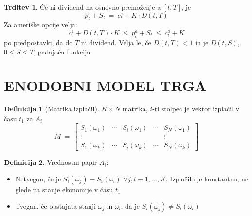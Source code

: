 \documentclass[11pt]{article}
\newcommand{\1}{\mathbbm{1}}
\theoremstyle{definition}
\newtheorem{definicija}{Definicija}[section]
\theoremstyle{definition}
\newtheorem{trditev}{Trditev}[section]
\begin{document}
\begin{trditev}

Če ni dividend na osnovno premoženje  a $[t, T]$, je
$$p_t^e + S_t ~=~ c_t^e + K \cdot D(t, T)$$
Za ameriške opcije velja:
$$c_t^a + D(t, T) \cdot K ~\leq~ p_t^a + S_t ~\leq~ c_t^a + K$$
po predpostavki, da do $T$ ni dividend. Velja le, če $D(t, T)<1$ in je $D(t, S)$, $0 \leq S \leq T$, padajoča funkcija. 

\end{trditev}
\vspace{0.5cm}

\pagebreak


\section{ENODOBNI MODEL TRGA}
\vspace{0.5cm}

\begin{definicija}[Matrika izplačil]

$K \times N$ matrika, $i$-ti stolpec je vektor izplačil v času $t_1$ za $A_i$
$$M ~=~ \begin{bmatrix}
S_1(\omega_1) & \cdots & S_i(\omega_1) & \cdots & S_N(\omega_1) \\
\vdots & ~ & ~ & ~ & \vdots \\
S_1(\omega_k) & \cdots & S_i(\omega_k) & \cdots & S_N(\omega_k)
\end{bmatrix}$$

\end{definicija}
\vspace{0.5cm}

\begin{definicija}

Vrednostni papir $A_i$:
\begin{itemize}

	\item Netvegan, če je $S_i(\omega_j) = S_i(\omega_l)$ $\forall j,l = 1, \ldots, K$. Izplačilo je konstantno, ne glede na stanje ekonomije v času $t_1$
	\item Tvegan, če obstajata stanji $\omega_j$ in $\omega_l$, da je $S_i(\omega_j) \neq S_i(\omega_l)$

\end{itemize}

\end{definicija}
\vspace{0.5cm}
\end{document}
